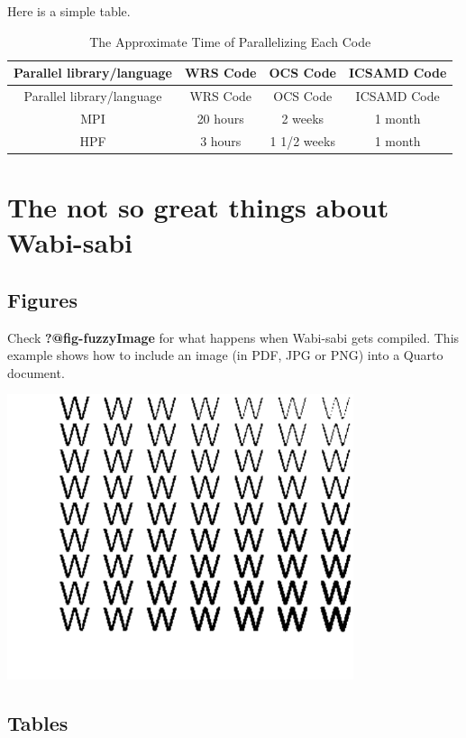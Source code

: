 \documentclass[
  dissertation]{bsu-cs}
\begin{document}
Here is a simple table.

\begin{longtable}[]{@{}cccc@{}}
\caption{The Approximate Time of Parallelizing Each
Code}\label{tbl-table4}\tabularnewline
\toprule\noalign{}
Parallel library/language & WRS Code & OCS Code & ICSAMD Code \\
\midrule\noalign{}
\endfirsthead
\toprule\noalign{}
Parallel library/language & WRS Code & OCS Code & ICSAMD Code \\
\midrule\noalign{}
\endhead
\bottomrule\noalign{}
\endlastfoot
MPI & 20 hours & 2 weeks & 1 month \\
HPF & 3 hours & 1 1/2 weeks & 1 month \\
\end{longtable}

\section{The not so great things about
Wabi-sabi}\label{the-not-so-great-things-about-wabi-sabi}

\subsection{Figures}\label{figures}

Check \textbf{?@fig-fuzzyImage} for what happens when Wabi-sabi gets
compiled. This example shows how to include an image (in PDF, JPG or
PNG) into a Quarto document.

\includegraphics[width=4in,height=\textheight]{figs/figure.pdf}

\subsection{Tables}\label{tables}
\end{document}
